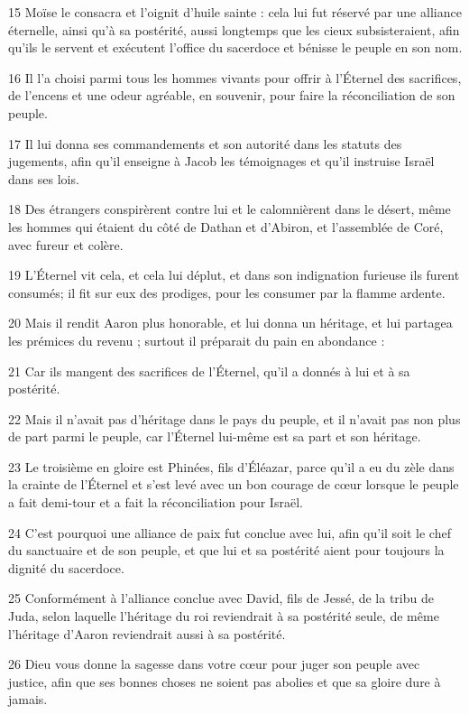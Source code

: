 \par 15 Moïse le consacra et l'oignit d'huile sainte : cela lui fut réservé par une alliance éternelle, ainsi qu'à sa postérité, aussi longtemps que les cieux subsisteraient, afin qu'ils le servent et exécutent l'office du sacerdoce et bénisse le peuple en son nom.
\par 16 Il l'a choisi parmi tous les hommes vivants pour offrir à l'Éternel des sacrifices, de l'encens et une odeur agréable, en souvenir, pour faire la réconciliation de son peuple.
\par 17 Il lui donna ses commandements et son autorité dans les statuts des jugements, afin qu'il enseigne à Jacob les témoignages et qu'il instruise Israël dans ses lois.
\par 18 Des étrangers conspirèrent contre lui et le calomnièrent dans le désert, même les hommes qui étaient du côté de Dathan et d'Abiron, et l'assemblée de Coré, avec fureur et colère.
\par 19 L'Éternel vit cela, et cela lui déplut, et dans son indignation furieuse ils furent consumés; il fit sur eux des prodiges, pour les consumer par la flamme ardente.
\par 20 Mais il rendit Aaron plus honorable, et lui donna un héritage, et lui partagea les prémices du revenu ; surtout il préparait du pain en abondance :
\par 21 Car ils mangent des sacrifices de l'Éternel, qu'il a donnés à lui et à sa postérité.
\par 22 Mais il n'avait pas d'héritage dans le pays du peuple, et il n'avait pas non plus de part parmi le peuple, car l'Éternel lui-même est sa part et son héritage.
\par 23 Le troisième en gloire est Phinées, fils d'Éléazar, parce qu'il a eu du zèle dans la crainte de l'Éternel et s'est levé avec un bon courage de cœur lorsque le peuple a fait demi-tour et a fait la réconciliation pour Israël.
\par 24 C'est pourquoi une alliance de paix fut conclue avec lui, afin qu'il soit le chef du sanctuaire et de son peuple, et que lui et sa postérité aient pour toujours la dignité du sacerdoce.
\par 25 Conformément à l'alliance conclue avec David, fils de Jessé, de la tribu de Juda, selon laquelle l'héritage du roi reviendrait à sa postérité seule, de même l'héritage d'Aaron reviendrait aussi à sa postérité.
\par 26 Dieu vous donne la sagesse dans votre cœur pour juger son peuple avec justice, afin que ses bonnes choses ne soient pas abolies et que sa gloire dure à jamais.

